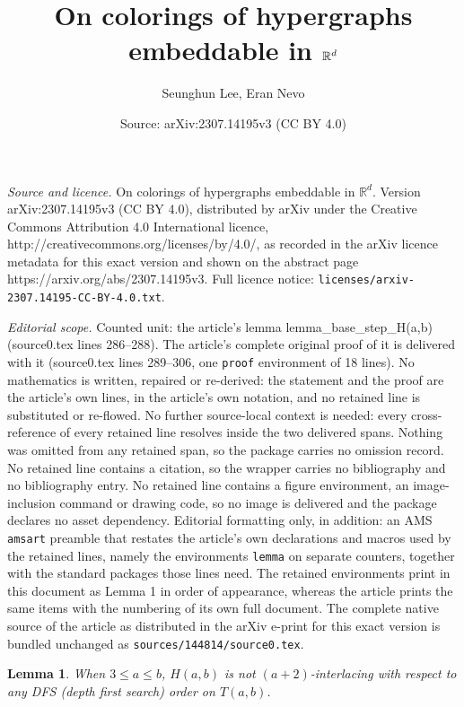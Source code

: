 \documentclass[10pt,a4paper]{amsart}
\title{On colorings of hypergraphs embeddable in $\RR^d$}
\author{Seunghun Lee, Eran Nevo}
\date{Source: arXiv:2307.14195v3 (CC BY 4.0)}
\newcommand{\RR}{\mathbb{R}}
\newtheorem{lemma}{Lemma}
\begin{document}
\maketitle

\noindent\emph{Source and licence.} On colorings of hypergraphs embeddable in $\RR^d$. Version arXiv:2307.14195v3 (CC BY 4.0), distributed by arXiv under the Creative Commons Attribution 4.0 International licence, http://creativecommons.org/licenses/by/4.0/, as recorded in the arXiv licence metadata for this exact version and shown on the abstract page https://arxiv.org/abs/2307.14195v3. Full licence notice: \texttt{licenses/arxiv-2307.14195-CC-BY-4.0.txt}.\par\smallskip

\noindent\textit{Editorial scope.} Counted unit: the article's lemma lemma\_base\_step\_H(a,b) (source0.tex lines 286--288). The article's complete original proof of it is delivered with it (source0.tex lines 289--306, one \texttt{proof} environment of 18 lines). No mathematics is written, repaired or re-derived: the statement and the proof are the article's own lines, in the article's own notation, and no retained line is substituted or re-flowed.  No further source-local context is needed: every cross-reference of every retained line resolves inside the two delivered spans.  Nothing was omitted from any retained span, so the package carries no omission record.  No retained line contains a citation, so the wrapper carries no bibliography and no bibliography entry.  No retained line contains a figure environment, an image-inclusion command or drawing code, so no image is delivered and the package declares no asset dependency.  Editorial formatting only, in addition: an AMS \texttt{amsart} preamble that restates the article's own declarations and macros used by the retained lines, namely the environments \texttt{lemma} on separate counters, together with the standard packages those lines need.  The retained environments print in this document as Lemma 1 in order of appearance, whereas the article prints the same items with the numbering of its own full document.  The complete native source of the article as distributed in the arXiv e-print for this exact version is bundled unchanged as \texttt{sources/144814/source0.tex}.
\begin{lemma} \label{lemma_base_step_H(a,b)}
  When $3\leq a \leq b$, $H(a,b)$ is not $(a+2)$-interlacing with respect to any DFS (depth first search) order on $T(a,b)$.
\end{lemma}
\end{document}
